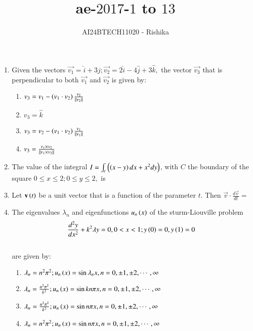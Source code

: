 \documentclass[journal,12pt,onecolumn]{IEEEtran}
\theoremstyle{remark}
\begin{document}

\vspace{3cm}

\title{ae-$2017$-$1$ to $13$}
\author{AI24BTECH11020 - Rishika}
\maketitle
\bigskip
\renewcommand{\thefigure}{\theenumi}
\renewcommand{\thetable}{\theenumi}
\begin{enumerate}[start=1]
\item Given the vectors $\vec{v_1}=\hat{i}+3\hat{j};\vec{v_2}=2\hat{i}-4\hat{j}+3\hat{k},$ the vector $\vec{v_3}$ that is perpendicular to both $\vec{v_1}$ and $\vec{v_2}$ is given by:
		\begin{enumerate}
	\item $v_3=v_1-\left(v_1\cdot v_2\right)\frac{v_2}{\left\lVert v_2\right\rVert}$
	\item $v_3=\hat{k}$
	\item $v_3=v_2-\left(v_1\cdot v_2\right)\frac{v_1}{\left\lVert v_1\right\rVert}$
	\item $v_3=\frac{v_1\times v_2}{\left\lVert v_1\times v_2\right\rVert}$
		\end{enumerate}
\item The value of the integral $I=\int_c\left(\left(x-y\right)dx+x^2dy\right)$, with $C$ the boundary of the square $0\leq x\leq 2;0\leq y\leq 2,$ is \underline{\hspace{2cm}}

\item Let $\mathbf{v}\left(t\right)$ be a unit vector that is a function of the parameter $t$. Then $\vec{v}\cdot\frac{d\vec{v}}{dt}=$ \underline{\hspace{2cm}}

\item The eigenvalues $\lambda_n$ and eigenfunctions $u_n\left(x\right)$ of the sturm-Liouville problem $$\frac{d^2y}{dx^2}+k^2\lambda y=0, 0<x<1; y\left(0\right)=0,y\left(1\right)=0$$\\
		are given by:
 \begin{enumerate}
	 \item $\lambda_n=n^2\pi^2;u_n\left(x\right)=\sin\lambda_nx,   n=0,\pm1,\pm2,\cdots,\infty$
	 \item $\lambda_n=\frac{n^2\pi^2}{k^2};u_n\left(x\right)=\sin kn\pi x,   n=0,\pm1,\pm2,\cdots,\infty$
	 \item $\lambda_n=\frac{n^2\pi^2}{k^2};u_n\left(x\right)=\sin n\pi x,   n=0,\pm1,\pm2,\cdots,\infty$
	 \item $\lambda_n=n^2\pi^2;u_n\left(x\right)=\sin n\pi x,   n=0,\pm1,\pm2,\cdots,\infty$
 \end{enumerate}


\end{enumerate}
\end{document}
